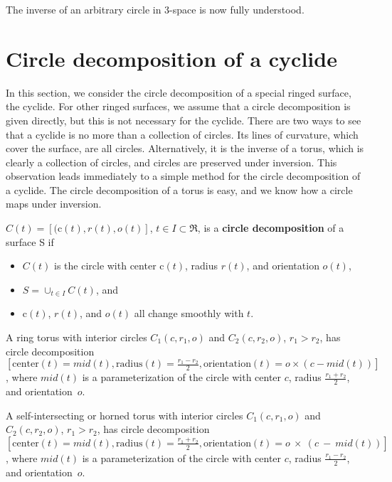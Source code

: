 The inverse of an arbitrary circle in 3-space is now fully understood.


% 

\section{Circle decomposition of a cyclide}
\label{sec-decomp}

In this section, we consider the circle decomposition of a special ringed
surface, the cyclide.
For other ringed surfaces, we assume that a circle decomposition is given
directly, but this is not necessary for the cyclide.
There are two ways to see that a
cyclide is no more than a collection of circles.
Its lines of curvature, which cover the surface, are all circles.
Alternatively, it is the inverse of a torus, 
which is clearly a collection of circles,
and circles are preserved under inversion.
This observation leads 
immediately to a simple method for the circle decomposition of a cyclide.
The circle decomposition of a torus is easy, 
and we know how a circle maps under inversion.

\begin{defn2}
$C(t) = [(\mbox{c}(t),r(t),o(t)]$, $t \in I \subset \Re$, is
a {\bf circle decomposition} of a surface S if 
\begin{itemize}
\item
	$C(t)$ is the circle with 
	center $\mbox{c}(t)$, radius $r(t)$, and orientation $o(t)$,
\item
	$S = \cup_{t \in I} C(t)$, and 
\item	
	$\mbox{c}(t)$, $r(t)$, and $o(t)$ all change smoothly with $t$.
\end{itemize}
\end{defn2}

\begin{lemma}
A ring torus with interior circles $C_1(c,r_1,o)$ and 
$C_2(c,r_2,o)$, $r_1 > r_2$, has circle decomposition 
$[\mbox{center}(t) = mid(t),
 \mbox{radius}(t) = \frac{r_1 - r_2}{2},
 \mbox{orientation}(t) = o \times (c - mid(t))]$,
where $mid(t)$ is a parameterization of the circle with center $c$,
radius $\frac{r_1+r_2}{2}$, and orientation~$o$.

A self-intersecting or horned torus with interior circles $C_1(c,r_1,o)$ and 
$C_2(c,r_2,o)$, $r_1 > r_2$, has circle decomposition 
$[\mbox{center}(t) = mid(t),
 \mbox{radius}(t) = \frac{r_1 + r_2}{2},
 \mbox{orientation}(t) = o~\times~(c~-~mid(t))]$,
where $mid(t)$ is a parameterization of the circle with center $c$,
radius $\frac{r_1-r_2}{2}$, and orientation~$o$.
\end{lemma}

